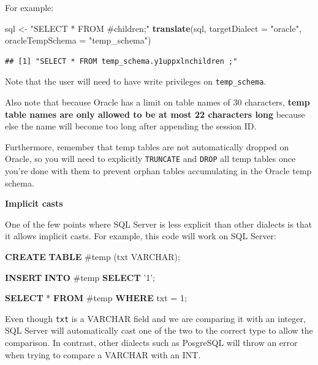 \documentclass[]{book}
\newenvironment{Shaded}{\begin{snugshade}}{\end{snugshade}}
\newcommand{\KeywordTok}[1]{\textcolor[rgb]{0.13,0.29,0.53}{\textbf{#1}}}
\newcommand{\DataTypeTok}[1]{\textcolor[rgb]{0.13,0.29,0.53}{#1}}
\newcommand{\DecValTok}[1]{\textcolor[rgb]{0.00,0.00,0.81}{#1}}
\newcommand{\StringTok}[1]{\textcolor[rgb]{0.31,0.60,0.02}{#1}}
\newcommand{\NormalTok}[1]{#1}
\begin{document}
For example:

\begin{Shaded}
\begin{Highlighting}[]
\NormalTok{sql <-}\StringTok{ "SELECT * FROM #children;"}
\KeywordTok{translate}\NormalTok{(sql, }\DataTypeTok{targetDialect =} \StringTok{"oracle"}\NormalTok{, }\DataTypeTok{oracleTempSchema =} \StringTok{"temp_schema"}\NormalTok{)}
\end{Highlighting}
\end{Shaded}

\begin{verbatim}
## [1] "SELECT * FROM temp_schema.y1uppxlnchildren ;"
\end{verbatim}

Note that the user will need to have write privileges on
\texttt{temp\_schema}.

Also note that because Oracle has a limit on table names of 30
characters, \textbf{temp table names are only allowed to be at most 22
characters long} because else the name will become too long after
appending the session ID.

Furthermore, remember that temp tables are not automatically dropped on
Oracle, so you will need to explicitly \texttt{TRUNCATE} and
\texttt{DROP} all temp tables once you're done with them to prevent
orphan tables accumulating in the Oracle temp schema.

\textbf{Implicit casts}

One of the few points where SQL Server is less explicit than other
dialects is that it allows implicit casts. For example, this code will
work on SQL Server:

\begin{Shaded}
\begin{Highlighting}[]
\KeywordTok{CREATE} \KeywordTok{TABLE}\NormalTok{ #temp (txt }\DataTypeTok{VARCHAR}\NormalTok{);}

\KeywordTok{INSERT} \KeywordTok{INTO}\NormalTok{ #temp}
\KeywordTok{SELECT} \StringTok{'1'}\NormalTok{;}

\KeywordTok{SELECT}\NormalTok{ * }\KeywordTok{FROM}\NormalTok{ #temp }\KeywordTok{WHERE}\NormalTok{ txt = }\DecValTok{1}\NormalTok{;}
\end{Highlighting}
\end{Shaded}

Even though \texttt{txt} is a VARCHAR field and we are comparing it with
an integer, SQL Server will automatically cast one of the two to the
correct type to allow the comparison. In contrast, other dialects such
as PosgreSQL will throw an error when trying to compare a VARCHAR with
an INT.
\end{document}
